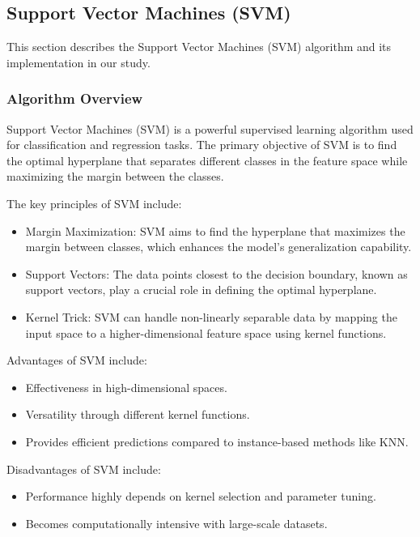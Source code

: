 \subsection{Support Vector Machines (SVM)}
\label{subsec:methods-svm}

This section describes the Support Vector Machines (SVM) algorithm and its implementation in our study.

\subsubsection{Algorithm Overview}

Support Vector Machines (SVM) is a powerful supervised learning algorithm used for classification and
regression tasks. The primary objective of SVM is to find the optimal hyperplane that separates different classes
in the feature space while maximizing the margin between the classes\cite{burges1998svmTutorial}.

The key principles of SVM include:
\begin{itemize}
    \item Margin Maximization: SVM aims to find the hyperplane that maximizes the margin between classes, which enhances the model's generalization capability.
    \item Support Vectors: The data points closest to the decision boundary, known as support vectors, play a crucial role in defining the optimal hyperplane.
    \item Kernel Trick: SVM can handle non-linearly separable data by mapping the input space to a higher-dimensional feature space using kernel functions.
\end{itemize}

Advantages of SVM include:
\begin{itemize}
    \item Effectiveness in high-dimensional spaces.
    \item Versatility through different kernel functions.
    \item Provides efficient predictions compared to instance-based methods like KNN.
\end{itemize}

Disadvantages of SVM include:
\begin{itemize}
    \item Performance highly depends on kernel selection and parameter tuning.
    \item Becomes computationally intensive with large-scale datasets.
\end{itemize}

